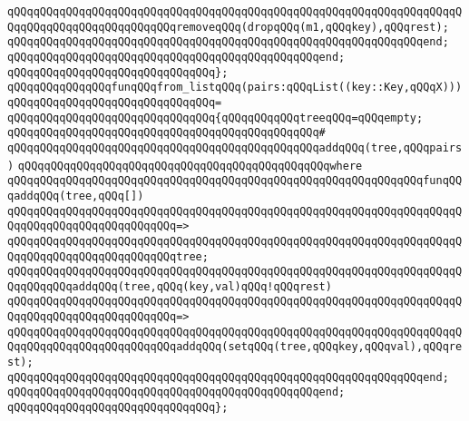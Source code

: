 \verb|qQQqqQQqqQQqqQQqqQQqqQQqqQQqqQQqqQQqqQQqqQQqqQQqqQQqqQQqqQQqqQQqqQQqqQQqqQQqqQQqqQQqqQQqqQQqqQQqremoveqQQq(dropqQQq(m1,qQQqkey),qQQqrest);|\newline
\verb|qQQqqQQqqQQqqQQqqQQqqQQqqQQqqQQqqQQqqQQqqQQqqQQqqQQqqQQqqQQqqQQqend;|\newline
\verb|qQQqqQQqqQQqqQQqqQQqqQQqqQQqqQQqqQQqqQQqqQQqqQQqend;|\newline
\verb|qQQqqQQqqQQqqQQqqQQqqQQqqQQqqQQq};|\newline
\newline
\verb|qQQqqQQqqQQqqQQqfunqQQqfrom_listqQQq(pairs:qQQqList((key::Key,qQQqX)))|\newline
\verb|qQQqqQQqqQQqqQQqqQQqqQQqqQQqqQQq=|\newline
\verb|qQQqqQQqqQQqqQQqqQQqqQQqqQQqqQQq{qQQqqQQqqQQqtreeqQQq=qQQqempty;|\newline
\verb|qQQqqQQqqQQqqQQqqQQqqQQqqQQqqQQqqQQqqQQqqQQqqQQq#|\newline
\verb|qQQqqQQqqQQqqQQqqQQqqQQqqQQqqQQqqQQqqQQqqQQqqQQqaddqQQq(tree,qQQqpairs)|\newline
\verb|qQQqqQQqqQQqqQQqqQQqqQQqqQQqqQQqqQQqqQQqqQQqqQQqwhere|\newline
\verb|qQQqqQQqqQQqqQQqqQQqqQQqqQQqqQQqqQQqqQQqqQQqqQQqqQQqqQQqqQQqqQQqfunqQQqaddqQQq(tree,qQQq[])|\newline
\verb|qQQqqQQqqQQqqQQqqQQqqQQqqQQqqQQqqQQqqQQqqQQqqQQqqQQqqQQqqQQqqQQqqQQqqQQqqQQqqQQqqQQqqQQqqQQqqQQq=>|\newline
\verb|qQQqqQQqqQQqqQQqqQQqqQQqqQQqqQQqqQQqqQQqqQQqqQQqqQQqqQQqqQQqqQQqqQQqqQQqqQQqqQQqqQQqqQQqqQQqqQQqtree;|\newline
\newline
\verb|qQQqqQQqqQQqqQQqqQQqqQQqqQQqqQQqqQQqqQQqqQQqqQQqqQQqqQQqqQQqqQQqqQQqqQQqqQQqqQQqaddqQQq(tree,qQQq(key,val)qQQq!qQQqrest)|\newline
\verb|qQQqqQQqqQQqqQQqqQQqqQQqqQQqqQQqqQQqqQQqqQQqqQQqqQQqqQQqqQQqqQQqqQQqqQQqqQQqqQQqqQQqqQQqqQQqqQQq=>|\newline
\verb|qQQqqQQqqQQqqQQqqQQqqQQqqQQqqQQqqQQqqQQqqQQqqQQqqQQqqQQqqQQqqQQqqQQqqQQqqQQqqQQqqQQqqQQqqQQqqQQqaddqQQq(setqQQq(tree,qQQqkey,qQQqval),qQQqrest);|\newline
\verb|qQQqqQQqqQQqqQQqqQQqqQQqqQQqqQQqqQQqqQQqqQQqqQQqqQQqqQQqqQQqqQQqend;|\newline
\verb|qQQqqQQqqQQqqQQqqQQqqQQqqQQqqQQqqQQqqQQqqQQqqQQqend;|\newline
\verb|qQQqqQQqqQQqqQQqqQQqqQQqqQQqqQQq};|\newline

